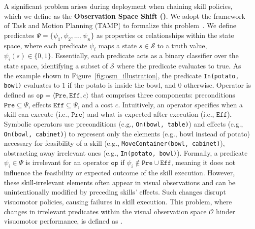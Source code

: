 A significant problem arises during deployment when chaining skill policies, which we define as the \textbf{Observation Space Shift (\pb)}. We adopt the framework of Task and Motion Planning (TAMP) to formalize this problem~\cite{garrett2021integrated, guo2023recent}. We define predicates $\Psi = \{\psi_1, \psi_2, \ldots, \psi_n\}$ as properties or relationships within the state space, where each predicate $\psi_i$ maps a state $s \in \mathcal{S}$ to a truth value, $\psi_i(s) \in \{0, 1\}$. Essentially, each predicate acts as a binary classifier over the state space, identifying a subset of $\mathcal{S}$ where the predicate evaluates to true. As the example shown in Figure~\ref{fig:osm_illustration}, the predicate \texttt{In(potato, bowl)} evaluates to 1 if the potato is inside the bowl, and 0 otherwise. Operator is defined as $\texttt{op} = \langle \texttt{Pre}, \texttt{Eff}, c \rangle$ that comprises three components: preconditions $\texttt{Pre} \subseteq \Psi$, effects $\texttt{Eff} \subseteq \Psi$, and a cost $c$. Intuitively, an operator specifies when a skill can execute (i.e., $\texttt{Pre}$) and what is expected after execution (i.e., $\texttt{Eff}$). Symbolic operators use preconditions (e.g., \texttt{On(bowl, table)}) and effects (e.g., \texttt{On(bowl, cabinet)}) to represent only the elements (e.g., bowl instead of potato) necessary for feasibility of a skill (e.g., \texttt{MoveContainer(bowl, cabinet)}), abstracting away irrelevant ones (e.g., \texttt{In(potato, bowl)}). Formally, a predicate $\psi_i \in \Psi$ is irrelevant for an operator $\texttt{op}$ if $\psi_i \notin \texttt{Pre} \cup \texttt{Eff}$, meaning it does not influence the feasibility or expected outcome of the skill execution. However, these skill-irrelevant elements often appear in visual observations and can be unintentionally modified by preceding skills' effects. Such changes disrupt visuomotor policies, causing failures in skill execution. This problem, where changes in irrelevant predicates within the visual observation space $\mathcal{O}$ hinder visuomotor performance, is defined as \pb.




